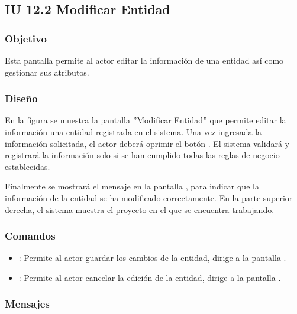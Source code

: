 \subsection{IU 12.2 Modificar Entidad}

\subsubsection{Objetivo}
	Esta pantalla permite al actor editar la información de una entidad así como gestionar sus atributos.
\subsubsection{Diseño}
	En la figura  se muestra la pantalla ''Modificar Entidad'' que permite editar la información una entidad registrada en el sistema.
	Una vez ingresada la información solicitada, el actor deberá oprimir el botón  . El sistema validará y registrará la información solo si se han cumplido todas las reglas de negocio establecidas.
	
	Finalmente se mostrará el mensaje  en la pantalla , para indicar que la información de la entidad se ha modificado correctamente.
	En la parte superior derecha, el sistema muestra el proyecto en el que se encuentra trabajando.

\subsubsection{Comandos}
\begin{itemize}
	\item {}: Permite al actor guardar los cambios de la entidad, dirige a la pantalla .
	\item {}: Permite al actor cancelar la edición de la entidad, dirige a la pantalla .
\end{itemize}

\subsubsection{Mensajes}

